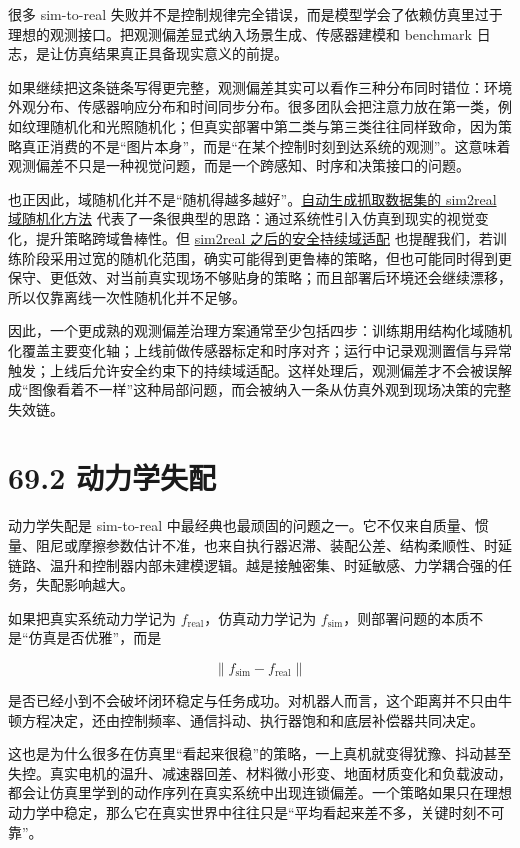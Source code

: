 很多 sim-to-real 失败并不是控制规律完全错误，而是模型学会了依赖仿真里过于理想的观测接口。把观测偏差显式纳入场景生成、传感器建模和 benchmark 日志，是让仿真结果真正具备现实意义的前提。

如果继续把这条链条写得更完整，观测偏差其实可以看作三种分布同时错位：环境外观分布、传感器响应分布和时间同步分布。很多团队会把注意力放在第一类，例如纹理随机化和光照随机化；但真实部署中第二类与第三类往往同样致命，因为策略真正消费的不是“图片本身”，而是“在某个控制时刻到达系统的观测”。这意味着观测偏差不只是一种视觉问题，而是一个跨感知、时序和决策接口的问题。

也正因此，域随机化并不是“随机得越多越好”。\href{https://arxiv.org/abs/2310.04517}{自动生成抓取数据集的 sim2real 域随机化方法} 代表了一条很典型的思路：通过系统性引入仿真到现实的视觉变化，提升策略跨域鲁棒性。但 \href{https://arxiv.org/abs/2503.10949}{sim2real 之后的安全持续域适配} 也提醒我们，若训练阶段采用过宽的随机化范围，确实可能得到更鲁棒的策略，但也可能同时得到更保守、更低效、对当前真实现场不够贴身的策略；而且部署后环境还会继续漂移，所以仅靠离线一次性随机化并不足够。

因此，一个更成熟的观测偏差治理方案通常至少包括四步：训练期用结构化域随机化覆盖主要变化轴；上线前做传感器标定和时序对齐；运行中记录观测置信与异常触发；上线后允许安全约束下的持续域适配。这样处理后，观测偏差才不会被误解成“图像看着不一样”这种局部问题，而会被纳入一条从仿真外观到现场决策的完整失效链。

\section*{69.2 动力学失配}


动力学失配是 sim-to-real 中最经典也最顽固的问题之一。它不仅来自质量、惯量、阻尼或摩擦参数估计不准，也来自执行器迟滞、装配公差、结构柔顺性、时延链路、温升和控制器内部未建模逻辑。越是接触密集、时延敏感、力学耦合强的任务，失配影响越大。

如果把真实系统动力学记为 \(f_{\text{real}}\)，仿真动力学记为 \(f_{\text{sim}}\)，则部署问题的本质不是“仿真是否优雅”，而是

\begin{equation*}
\| f_{\text{sim}} - f_{\text{real}} \|
\end{equation*}

是否已经小到不会破坏闭环稳定与任务成功。对机器人而言，这个距离并不只由牛顿方程决定，还由控制频率、通信抖动、执行器饱和和底层补偿器共同决定。

这也是为什么很多在仿真里“看起来很稳”的策略，一上真机就变得犹豫、抖动甚至失控。真实电机的温升、减速器回差、材料微小形变、地面材质变化和负载波动，都会让仿真里学到的动作序列在真实系统中出现连锁偏差。一个策略如果只在理想动力学中稳定，那么它在真实世界中往往只是“平均看起来差不多，关键时刻不可靠”。

